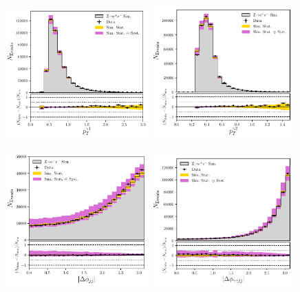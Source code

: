 \begin{figure}[h!]
    \begin{center}
        \includegraphics[width=0.49\textwidth]{figures/appendix_zee/lead_ptom_zee_LPS.pdf}
        \includegraphics[width=0.49\textwidth]{figures/appendix_zee/sublead_ptom_zee_LPS.pdf}
    \end{center}
    \begin{center}
        \includegraphics[width=0.49\textwidth]{figures/appendix_zee/dphi_jetjet_zee_LPS.pdf}
        \includegraphics[width=0.49\textwidth]{figures/appendix_zee/dphi_gamgamjetjet_zee_LPS.pdf}

\end{center}
\end{figure}
